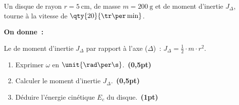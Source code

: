 \begin{minipage}{0.75\linewidth}
    Un disque de rayon $r=\qty{5}{\cm}$, de masse $m=\qty{200}{\gram}$ et de
    moment d'inertie $J_{\Delta}$, tourne à la vitesse de
    $\qty{20}{\tr\per\min}$.
    
    \textbf{On donne~:}\par
    Le de moment d'inertie $J_{\Delta}$ par rapport à l'axe ($\Delta$)~:
    $J_{\Delta}=\frac{1}{2} \cdot m \cdot r^2$.
    \begin{enumerate}
        \item Exprimer $\omega$ en $\unit{\rad\per\s}$.~\textbf{(0,5pt)}
        \item Calculer le moment d'inertie $J_{\Delta}$.~\textbf{(0,5pt)}
        \item Déduire l'énergie cinétique $E_c$ du disque.~\textbf{(1pt)}
    \end{enumerate}
\end{minipage}
\hfill
\begin{minipage}{0.24\linewidth}
    \flushright
\end{minipage}

